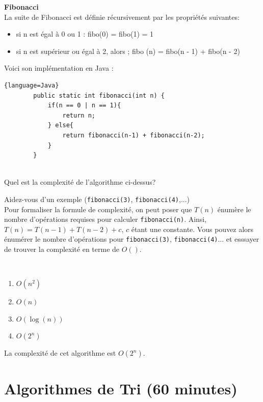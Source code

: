 \begin{Exercice} [10 minutes] \textbf{Fibonacci}\\
La suite de Fibonacci est définie récursivement par les propriétés suivantes:
\begin{itemize}
    \item si n est égal à 0 ou 1 : fibo(0) = fibo(1) = 1
    \item si n est supérieur ou égal à 2, alors ; fibo (n) = fibo(n - 1) + fibo(n - 2)
\end{itemize}

Voici son implémentation en Java :

\begin{lstlisting}{language=Java}
        public static int fibonacci(int n) {
            if(n == 0 | n == 1){
                return n;
            } else{
                return fibonacci(n-1) + fibonacci(n-2);
            }
        }
        
\end{lstlisting}

Quel est la complexité de l'algorithme ci-dessus?

\begin{conseil}
Aidez-vous d'un exemple (\lstinline{fibonacci(3)}, \lstinline{fibonacci(4)},...) \\
Pour formaliser la formule de complexité, on peut poser que $T(n)$ énumère le nombre d'opérations requises pour calculer \lstinline{fibonacci(n)}. Ainsi, $T(n) = T(n-1) + T(n-2) + c$, $c$ étant une constante. Vous pouvez alors énumérer le nombre d'opérations pour \lstinline{fibonacci(3)}, \lstinline{fibonacci(4)}... et esssayer de trouver la complexité en terme de $O()$.
\end{conseil}

\ \\

\begin{enumerate}
    \item $O(n^2)$
    \item $O(n)$
    \item $O(\log(n))$
    \item $O(2^n)$
\end{enumerate}

\begin{solution}
    La complexité de cet algorithme est $O(2^n)$.
\end{solution}
\end{Exercice}

\section{Algorithmes de Tri (60 minutes)}

